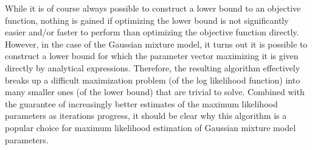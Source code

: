 \documentclass[10pt,twoside]{book}
\begin{document}
While it is of course always possible to construct a lower bound to an objective function, nothing is gained if optimizing
the lower bound is not significantly easier and/or faster to perform than optimizing the objective function directly. However,
in the case of the Gaussian mixture model, it turns out it is possible to construct a lower bound for which the parameter vector 
maximizing it is given directly by analytical expressions. Therefore, the resulting algorithm effectively breaks up a difficult 
maximization problem (of the log likelihood function) into many smaller ones (of the lower bound) that are trivial to solve. Combined 
with the guarantee of increasingly better estimates of the maximum likelihood parameters as iterations progress, it should be clear
why this algorithm is a popular choice for maximum likelihood estimation of Gaussian mixture model parameters.
\end{document}
